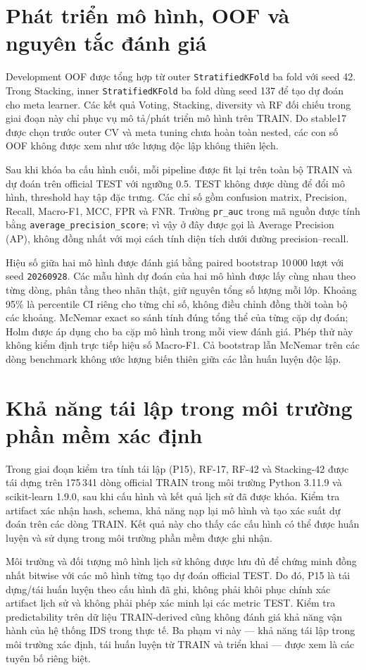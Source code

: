 \section{Phát triển mô hình, OOF và nguyên tắc đánh giá}
\label{sec:method-validation}

Development OOF được tổng hợp từ outer \texttt{StratifiedKFold} ba fold với seed 42. Trong Stacking, inner \texttt{StratifiedKFold} ba fold dùng seed 137 để tạo dự đoán cho meta learner. Các kết quả Voting, Stacking, diversity và RF đối chiếu trong giai đoạn này chỉ phục vụ mô tả/phát triển mô hình trên TRAIN. Do stable17 được chọn trước outer CV và meta tuning chưa hoàn toàn nested, các con số OOF không được xem như ước lượng độc lập không thiên lệch.

Sau khi khóa ba cấu hình cuối, mỗi pipeline được fit lại trên toàn bộ TRAIN và dự đoán trên official TEST với ngưỡng 0.5. TEST không được dùng để đổi mô hình, threshold hay tập đặc trưng. Các chỉ số gồm confusion matrix, Precision, Recall, Macro-F1, MCC, FPR và FNR. Trường \texttt{pr\_auc} trong mã nguồn được tính bằng \texttt{average\_precision\_score}; vì vậy ở đây được gọi là Average Precision (AP), không đồng nhất với mọi cách tính diện tích dưới đường precision--recall.

Hiệu số giữa hai mô hình được đánh giá bằng paired bootstrap 10\,000 lượt với seed \texttt{20260928}. Các mẫu hình dự đoán của hai mô hình được lấy cùng nhau theo từng dòng, phân tầng theo nhãn thật, giữ nguyên tổng số lượng mỗi lớp. Khoảng 95\% là percentile CI riêng cho từng chỉ số, không điều chỉnh đồng thời toàn bộ các khoảng. McNemar exact so sánh tính đúng tổng thể của từng cặp dự đoán; Holm được áp dụng cho ba cặp mô hình trong mỗi view đánh giá. Phép thử này không kiểm định trực tiếp hiệu số Macro-F1. Cả bootstrap lẫn McNemar trên các dòng benchmark không ước lượng biến thiên giữa các lần huấn luyện độc lập.

\section{Khả năng tái lập trong môi trường phần mềm xác định}
\label{sec:method-p15}

Trong giai đoạn kiểm tra tính tái lập (P15), RF-17, RF-42 và Stacking-42 được tái dựng trên 175\,341 dòng official TRAIN trong môi trường Python 3.11.9 và scikit-learn 1.9.0, sau khi cấu hình và kết quả lịch sử đã được khóa. Kiểm tra artifact xác nhận hash, schema, khả năng nạp lại mô hình và tạo xác suất dự đoán trên các dòng TRAIN. Kết quả này cho thấy các cấu hình có thể được huấn luyện và sử dụng trong môi trường phần mềm được ghi nhận.

Môi trường và đối tượng mô hình lịch sử không được lưu đủ để chứng minh đồng nhất bitwise với các mô hình từng tạo dự đoán official TEST. Do đó, P15 là tái dựng/tái huấn luyện theo cấu hình đã ghi, không phải khôi phục chính xác artifact lịch sử và không phải phép xác minh lại các metric TEST. Kiểm tra predictability trên dữ liệu TRAIN-derived cũng không đánh giá khả năng vận hành của hệ thống IDS trong thực tế. Ba phạm vi này — khả năng tái lập trong môi trường xác định, tái huấn luyện từ TRAIN và triển khai — được xem là các tuyên bố riêng biệt.
